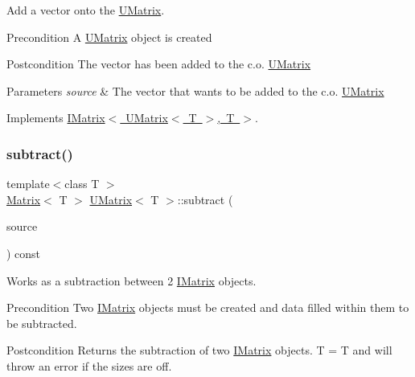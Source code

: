Add a vector onto the \mbox{\hyperlink{class_u_matrix}{U\+Matrix}}. 

\begin{DoxyPrecond}{Precondition}
A \mbox{\hyperlink{class_u_matrix}{U\+Matrix}} object is created 
\end{DoxyPrecond}
\begin{DoxyPostcond}{Postcondition}
The vector has been added to the c.\+o. \mbox{\hyperlink{class_u_matrix}{U\+Matrix}}
\end{DoxyPostcond}

\begin{DoxyParams}{Parameters}
{\em source} & The vector that wants to be added to the c.\+o. \mbox{\hyperlink{class_u_matrix}{U\+Matrix}} \\
\hline
\end{DoxyParams}


Implements \mbox{\hyperlink{class_i_matrix_aa5de147c7aa5b74b0f2177ed1a8158de}{I\+Matrix$<$ U\+Matrix$<$ T $>$, T $>$}}.

\mbox{\label{class_u_matrix_afde9d8093462f7e07f856c6f7c5106b1}} 
\subsubsection{\texorpdfstring{subtract()}{subtract()}\hspace{0.1cm}{\footnotesize\ttfamily [1/6]}}
{\footnotesize\ttfamily template$<$class T $>$ \\
\mbox{\hyperlink{class_matrix}{Matrix}}$<$ T $>$ \mbox{\hyperlink{class_u_matrix}{U\+Matrix}}$<$ T $>$\+::subtract (\begin{DoxyParamCaption}\item[{const \mbox{\hyperlink{class_i_matrix}{I\+Matrix}}$<$ \mbox{\hyperlink{class_matrix}{Matrix}}$<$ T $>$, T $>$ \&}]{source }\end{DoxyParamCaption}) const}



Works as a subtraction between 2 \mbox{\hyperlink{class_i_matrix}{I\+Matrix}} objects. 

\begin{DoxyPrecond}{Precondition}
Two \mbox{\hyperlink{class_i_matrix}{I\+Matrix}} objects must be created and data filled within them to be subtracted. 
\end{DoxyPrecond}
\begin{DoxyPostcond}{Postcondition}
Returns the subtraction of two \mbox{\hyperlink{class_i_matrix}{I\+Matrix}} objects. T = T and will throw an error if the sizes are off.
\end{DoxyPostcond}

